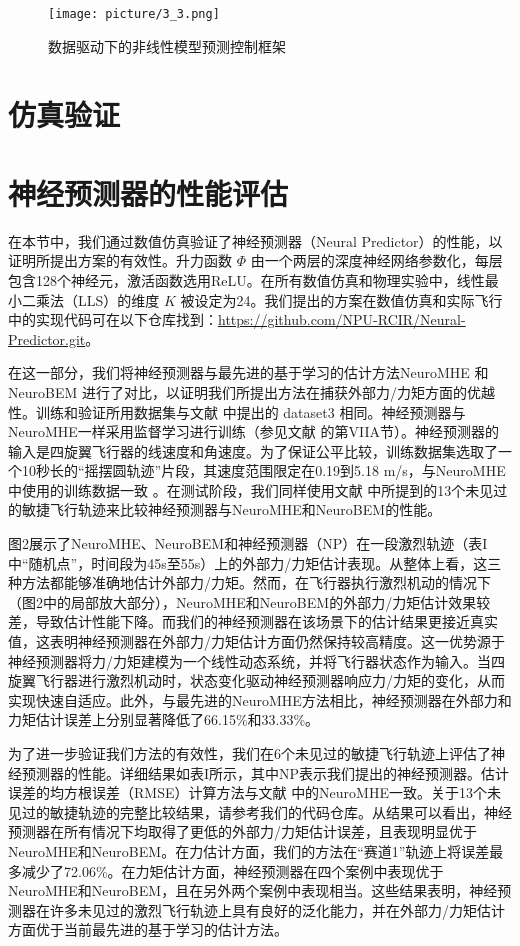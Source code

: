 \documentclass[lang=chs, degree=master, blindreview=false, winfonts=true]{yanputhesis}
\begin{document}
\begin{figure}[hbt!]
	\centering
	\texttt{[image: picture/3\_3.png]} 
	\caption{数据驱动下的非线性模型预测控制框架} \label{illustration_framework}
\end{figure}
\section{仿真验证}

\section{神经预测器的性能评估}

在本节中，我们通过数值仿真验证了神经预测器（Neural Predictor）的性能，以证明所提出方案的有效性。升力函数 $\Phi$ 由一个两层的深度神经网络参数化，每层包含128个神经元，激活函数选用ReLU。在所有数值仿真和物理实验中，线性最小二乘法（LLS）的维度 $K$ 被设定为24。我们提出的方案在数值仿真和实际飞行中的实现代码可在以下仓库找到：\href{https://github.com/NPU-RCIR/Neural-Predictor.git}{https://github.com/NPU-RCIR/Neural-Predictor.git}。

在这一部分，我们将神经预测器与最先进的基于学习的估计方法NeuroMHE \cite{NeuroMHE} 和 NeuroBEM \cite{NeuroBEM} 进行了对比，以证明我们所提出方法在捕获外部力/力矩方面的优越性。训练和验证所用数据集与文献 \cite{NeuroBEM} 中提出的 dataset3 相同。神经预测器与NeuroMHE一样采用监督学习进行训练（参见文献 \cite{NeuroMHE} 的第VIIA节）。神经预测器的输入是四旋翼飞行器的线速度和角速度。为了保证公平比较，训练数据集选取了一个10秒长的“摇摆圆轨迹”片段，其速度范围限定在0.19到5.18 m/s，与NeuroMHE中使用的训练数据一致 \cite{NeuroMHE}。在测试阶段，我们同样使用文献 \cite{NeuroMHE} 中所提到的13个未见过的敏捷飞行轨迹来比较神经预测器与NeuroMHE和NeuroBEM的性能。

图2展示了NeuroMHE、NeuroBEM和神经预测器（NP）在一段激烈轨迹（表I中“随机点”，时间段为45s至55s）上的外部力/力矩估计表现。从整体上看，这三种方法都能够准确地估计外部力/力矩。然而，在飞行器执行激烈机动的情况下（图2中的局部放大部分），NeuroMHE和NeuroBEM的外部力/力矩估计效果较差，导致估计性能下降。而我们的神经预测器在该场景下的估计结果更接近真实值，这表明神经预测器在外部力/力矩估计方面仍然保持较高精度。这一优势源于神经预测器将力/力矩建模为一个线性动态系统，并将飞行器状态作为输入。当四旋翼飞行器进行激烈机动时，状态变化驱动神经预测器响应力/力矩的变化，从而实现快速自适应。此外，与最先进的NeuroMHE方法相比，神经预测器在外部力和力矩估计误差上分别显著降低了66.15\%和33.33\%。

为了进一步验证我们方法的有效性，我们在6个未见过的敏捷飞行轨迹上评估了神经预测器的性能。详细结果如表I所示，其中NP表示我们提出的神经预测器。估计误差的均方根误差（RMSE）计算方法与文献 \cite{NeuroMHE} 中的NeuroMHE一致。关于13个未见过的敏捷轨迹的完整比较结果，请参考我们的代码仓库。从结果可以看出，神经预测器在所有情况下均取得了更低的外部力/力矩估计误差，且表现明显优于NeuroMHE和NeuroBEM。在力估计方面，我们的方法在“赛道1”轨迹上将误差最多减少了72.06\%。在力矩估计方面，神经预测器在四个案例中表现优于NeuroMHE和NeuroBEM，且在另外两个案例中表现相当。这些结果表明，神经预测器在许多未见过的激烈飞行轨迹上具有良好的泛化能力，并在外部力/力矩估计方面优于当前最先进的基于学习的估计方法。
\end{document}
